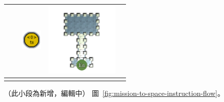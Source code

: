 \begin{longtable}{
    | >{\centering\arraybackslash} m{1.0cm}
    | >{\centering\arraybackslash} m{3.5cm}
    | >{} m{1.0cm}
    | >{\centering\arraybackslash} m{1.0cm}
    | >{\centering\arraybackslash} m{3.5cm} | }
    &
    & \begin{minipage}{.3\textwidth}\includegraphics[width=10mm]{figures/mission-grammars-alphabet/t-treasure.png}\end{minipage}
    & \begin{minipage}{.3\textwidth}\includegraphics[width=35mm]{figures/mission-grammars-ins-rep/instruction-12.png}\end{minipage}
    \\\cline{1-2}\cline{4-5}
\end{longtable}

（此小段為新增，編輯中）
圖~\ref{fig:mission-to-space-instruction-flow}。

